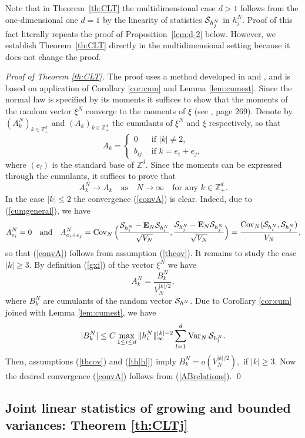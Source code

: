 \documentclass{article}
\numberwithin{equation}{section}
\newcommand{\mZ}{\mathbb{Z}}
\newcommand{\SSS}{{\cal S}}
\newcommand{\Cov}{\operatorname{Cov}}
\newcommand{\Var}{\operatorname{Var}}
\newcommand{\MON}{\mbox{\bf E}_N}
\newcommand{\ra}{\rightarrow}
\newcommand{\fr}{\frac}
\newcommand{\qmb}{\quad\mbox}
\newcommand{\qu}{\quad}
\newcommand{\sli}{\sum\limits}
\newcommand{\lbl}{\label}
\newcommand{\ass}{\quad\mbox{as}\quad}
\newcommand{\bee}{\begin{equation}}
\newcommand{\eee}{\end{equation}}
\newcommand{\non}{\nonumber}
\newcommand{\Zp}{\mathbb{Z}^d_+}
\begin{document}
Note that in Theorem~\ref{th:CLT} the multidimensional case $d>1$ follows from the one-dimensional one $d=1$ by the linearity of statistics $\SSS_{h_j^N}$ in $h_j^N$. Proof of this fact literally repeats the proof of Proposition~\ref{lem:d-2} below. 
However, we establish Theorem~\ref{th:CLT} directly in the multidimensional setting because it does not change the proof.
 
{\it Proof of Theorem \ref{th:CLT}.}
The proof uses a method developed in \cite{CL} and \cite{So00},
and is based on application of Corollary \ref{cor:cum} and Lemma \ref{lem:cumest}.
Since the normal law is specified by its moments
it suffices to show that the moments of the random vector $\xi^N$
converge to the moments of  $\xi$
(see \cite{F}, page 269).
Denote by $(A^N_k)_{k\in\Zp}$ and  $(A_k)_{k\in\Zp}$
the cumulants of $\xi^N$ and $\xi$ respectively, so that
\bee\non
A_k=\left\{
\begin{array}{cl}
0 &\mbox{ if } |k|\neq 2, \\
b_{ij} &\mbox{ if } k=e_i+e_j,
\end{array}
\right.
\eee
where $(e_l)$ is the standard base of $\mZ^d$.
Since the moments can be expressed through the cumulants,
it suffices to prove that
\bee\lbl{convA}
A_k^N\ra A_k \ass N\ra\infty \qmb{for any }k\in\Zp.
\eee
In the case $|k|\leq 2$ the convergence (\ref{convA}) is clear.
Indeed, due to (\ref{cumgeneral}), we have
$$
A^N_{e_i}=0 \qmb{and}\qu
A^N_{e_i+e_j}=
\Cov_N\Big(\fr{\SSS_{h^N_i}-\MON\SSS_{h^N_i}}{\sqrt{V_N}},
\fr{\SSS_{h^N_j}-\MON\SSS_{h^N_j}}{\sqrt{V_N}}\Big)= \fr{\Cov_N(\SSS_{h^N_i},\SSS_{h^N_j})}{V_N},
$$
so that  (\ref{convA}) follows from assumption (\ref{thcov}).
It remains to study the case $|k|\geq 3$.
By definition (\ref{gxi}) of the vector $\xi^N$ we have
\bee\lbl{ABrelations}
A_k^N=\fr{B_k^N}{V_N^{|k|/2}},
\eee
where $B_k^N$ are cumulants of the random vector $\SSS_{h^N}$.
Due to Corollary \nolinebreak \ref{cor:cum} joined with Lemma \ref{lem:cumest}, we have
\bee\non
|B^N_k|\leq C\max\limits_{1\leq i\leq d} \|h^N_i\|^{|k|-2}_\infty \sli_{l=1}^d \Var_N\SSS_{h^N_l}.
\eee
Then, assumptions (\ref{thcov}) and (\ref{th|h|}) imply
$
B^N_k= o(V_N^{|k|/2}),
$
if $|k|\geq 3$.
Now the desired convergence (\ref{convA})
follows from (\ref{ABrelations}).
\qed








\subsection{Joint linear statistics of growing and bounded variances: Theorem \ref{th:CLTj}}
\lbl{sec:CLTj}
\end{document}
